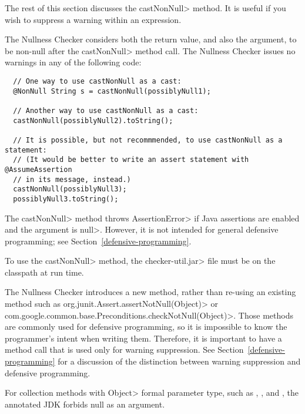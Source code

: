 The rest of this section discusses the \<castNonNull> method.
It is useful if you wish to suppress a warning within an expression.

The Nullness Checker considers both the return value, and also the
argument, to be non-null after the \<castNonNull> method call.
The Nullness Checker issues no warnings in any of the following
code:

\begin{Verbatim}
  // One way to use castNonNull as a cast:
  @NonNull String s = castNonNull(possiblyNull1);

  // Another way to use castNonNull as a cast:
  castNonNull(possiblyNull2).toString();

  // It is possible, but not recommmended, to use castNonNull as a statement:
  // (It would be better to write an assert statement with @AssumeAssertion
  // in its message, instead.)
  castNonNull(possiblyNull3);
  possiblyNull3.toString();
\end{Verbatim}

  The \<castNonNull> method throws \<AssertionError> if Java assertions are enabled and
  the argument is \<null>.  However, it is not intended for general defensive
  programming; see Section~\ref{defensive-programming}.

  To use the \<castNonNull> method, the \<checker-util.jar> file
  must be on the classpath at run time.

\begin{sloppypar}
The Nullness Checker introduces a new method, rather than re-using an
existing method such as \<org.junit.Assert.assertNotNull(Object)> or
\<com.google.common.base.Preconditions.checkNotNull(Object)>.  Those
methods are commonly used for defensive programming, so it is impossible to
know the programmer's intent when writing them.  Therefore, it is important to
have a method call that is used only for warning suppression.  See
Section~\ref{defensive-programming} for a discussion of
the distinction between warning suppression and defensive programming.
\end{sloppypar}



For collection methods with \<Object> formal parameter type, such as
,
, and
,
the annotated JDK forbids null as an argument.

